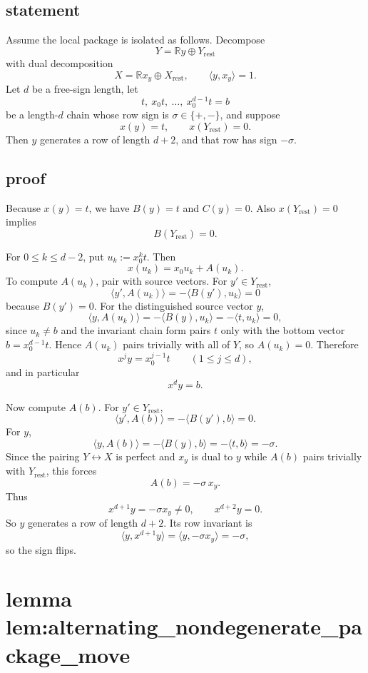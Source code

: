 \documentclass[
]{article}
\begin{document}
\subsection{statement}\label{statement-6}

Assume the local package is isolated as follows. Decompose \[
Y=\mathbb R y\oplus Y_{\mathrm{rest}}
\] with dual decomposition \[
X=\mathbb R x_y\oplus X_{\mathrm{rest}},
\qquad
\langle y,x_y\rangle=1.
\] Let \(d\) be a free-sign length, let \[
t,\ x_0t,\ \dots,\ x_0^{d-1}t=b
\] be a length-\(d\) chain whose row sign is \(\sigma\in\{+,-\}\), and
suppose \[
x(y)=t,\qquad x(Y_{\mathrm{rest}})=0.
\] Then \(y\) generates a row of length \(d+2\), and that row has sign
\(-\sigma\).

\subsection{proof}\label{proof-6}

Because \(x(y)=t\), we have \(B(y)=t\) and \(C(y)=0\). Also
\(x(Y_{\mathrm{rest}})=0\) implies \[
B(Y_{\mathrm{rest}})=0.
\]

For \(0\le k\le d-2\), put \(u_k:=x_0^k t\). Then \[
x(u_k)=x_0u_k+A(u_k).
\] To compute \(A(u_k)\), pair with source vectors. For
\(y'\in Y_{\mathrm{rest}}\), \[
\langle y',A(u_k)\rangle=-\langle B(y'),u_k\rangle=0
\] because \(B(y')=0\). For the distinguished source vector \(y\), \[
\langle y,A(u_k)\rangle=-\langle B(y),u_k\rangle=-\langle t,u_k\rangle=0,
\] since \(u_k\neq b\) and the invariant chain form pairs \(t\) only
with the bottom vector \(b=x_0^{d-1}t\). Hence \(A(u_k)\) pairs
trivially with all of \(Y\), so \(A(u_k)=0\). Therefore \[
x^{j}y=x_0^{j-1}t\qquad(1\le j\le d),
\] and in particular \[
x^d y=b.
\]

Now compute \(A(b)\). For \(y'\in Y_{\mathrm{rest}}\), \[
\langle y',A(b)\rangle=-\langle B(y'),b\rangle=0.
\] For \(y\), \[
\langle y,A(b)\rangle=-\langle B(y),b\rangle=-\langle t,b\rangle=-\sigma.
\] Since the pairing \(Y\leftrightarrow X\) is perfect and \(x_y\) is
dual to \(y\) while \(A(b)\) pairs trivially with \(Y_{\mathrm{rest}}\),
this forces \[
A(b)=-\sigma\,x_y.
\] Thus \[
x^{d+1}y=-\sigma x_y\neq 0,\qquad x^{d+2}y=0.
\] So \(y\) generates a row of length \(d+2\). Its row invariant is \[
\langle y,x^{d+1}y\rangle=\langle y,-\sigma x_y\rangle=-\sigma,
\] so the sign flips.

\section{lemma
lem:alternating\_nondegenerate\_package\_move}\label{lemma-lemalternating_nondegenerate_package_move}
\end{document}
